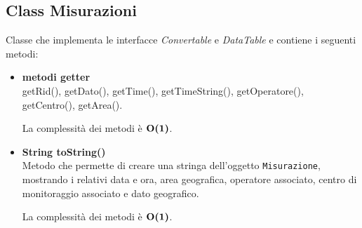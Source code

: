\documentclass[a4paper, 12pt]{scrreprt}
\begin{document}
			\subsection{Class Misurazioni}
			Classe che implementa le interfacce \textsl{Convertable} e \textsl{DataTable} e contiene i seguenti metodi:\\
			\begin{itemize}
				\item \textbf{metodi getter}
				\\getRid(), getDato(), getTime(), getTimeString(), getOperatore(), getCentro(), getArea().
				
				La complessit\`a dei metodi \`e $\mathbf{O}\textbf{(1)}$.
				
				\item \textbf{String toString()}
				\\Metodo che permette di creare una stringa dell'oggetto \verb!Misurazione!, mostrando i relativi data e ora, area geografica, operatore associato, centro di monitoraggio associato e dato geografico.
				
				La complessit\`a dei metodi \`e $\mathbf{O}\textbf{(1)}$.
				
			\end{itemize}
\pagebreak
\end{document}
